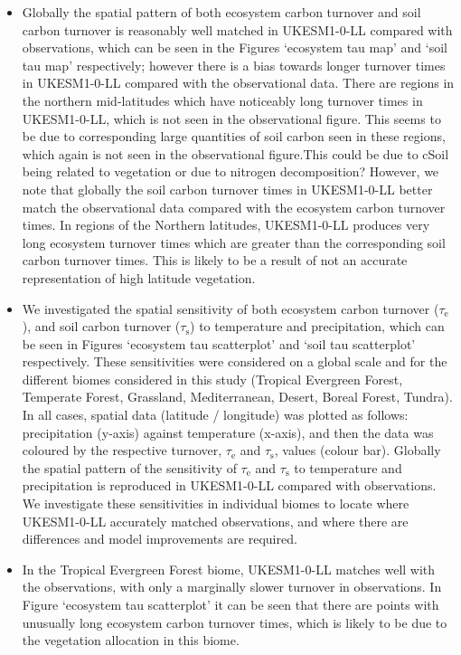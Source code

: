 \begin{itemize}

	\item Globally the spatial pattern of both ecosystem carbon turnover and soil carbon turnover is reasonably well matched in UKESM1-0-LL compared with observations, which can be seen in the Figures `ecosystem tau map' and `soil tau map' respectively; however there is a bias towards longer turnover times in UKESM1-0-LL compared with the observational data. There are regions in the northern mid-latitudes which have noticeably long turnover times in UKESM1-0-LL, which is not seen in the observational figure. This seems to be due to corresponding large quantities of soil carbon seen in these regions, which again is not seen in the observational figure.This could be due to cSoil being related to vegetation or due to nitrogen decomposition? However, we note that globally the soil carbon turnover times in UKESM1-0-LL better match the observational data compared with the ecosystem carbon turnover times. In regions of the Northern latitudes, UKESM1-0-LL produces very long ecosystem turnover times which are greater than the corresponding soil carbon turnover times. This is likely to be a result of not an accurate representation of high latitude vegetation.
	
	\item We investigated the spatial sensitivity of both ecosystem carbon turnover ($\tau_\mathrm{e}$), and soil carbon turnover ($\tau_\mathrm{s}$) to temperature and precipitation, which can be seen in Figures `ecosystem tau scatterplot' and `soil tau scatterplot' respectively. These sensitivities were considered on a global scale and for the different biomes considered in this study (Tropical Evergreen Forest, Temperate Forest, Grassland, Mediterranean, Desert, Boreal Forest, Tundra). In all cases, spatial data (latitude / longitude) was plotted as follows: precipitation (y-axis) against temperature (x-axis), and then the data was coloured by the respective turnover, $\tau_\mathrm{e}$ and $\tau_\mathrm{s}$, values (colour bar). Globally the spatial pattern of the sensitivity of $\tau_\mathrm{e}$ and $\tau_\mathrm{s}$ to temperature and precipitation is reproduced in UKESM1-0-LL compared with observations. We investigate these sensitivities in individual biomes to locate where UKESM1-0-LL accurately matched observations, and where there are differences and model improvements are required.
	
	\item In the Tropical Evergreen Forest biome, UKESM1-0-LL matches well with the observations, with only a marginally slower turnover in observations. In Figure `ecosystem tau scatterplot' it can be seen that there are points with unusually long ecosystem carbon turnover times, which is likely to be due to the vegetation allocation in this biome.
	

\end{itemize}
